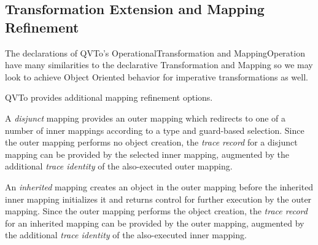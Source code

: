 \documentclass[runningheads,a4paper]{llncs}
\begin{document}


\subsection{Transformation Extension and Mapping Refinement}

The declarations of QVTo's OperationalTransformation and MappingOperation have many similarities to the declarative Transformation and Mapping so we may look to achieve Object Oriented behavior for imperative transformations as well.

QVTo provides additional mapping refinement options.

A \emph{disjunct} mapping provides an outer mapping which redirects to one of a number of inner mappings according to a type and guard-based selection. Since the outer mapping performs no object creation, the \emph{trace record} for a disjunct mapping can be provided by the selected inner mapping, augmented by the additional  \emph{trace identity} of the also-executed outer mapping.

An \emph{inherited} mapping creates an object in the outer mapping before the inherited inner mapping initializes it and returns control for further execution by the outer mapping. Since the outer mapping performs the object creation, the \emph{trace record} for an inherited mapping can be provided by the outer mapping, augmented by the additional  \emph{trace identity} of the also-executed inner mapping.
\end{document}
